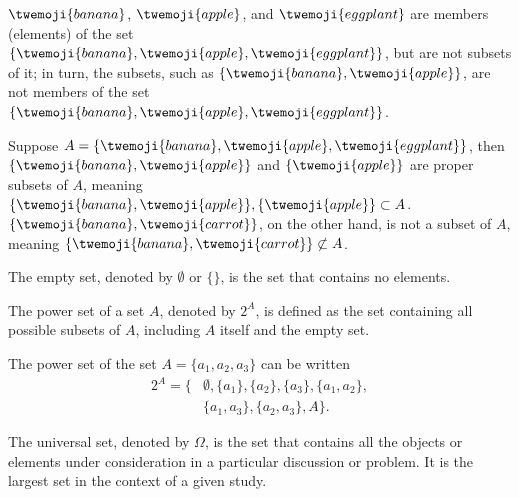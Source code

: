 \newpage
\begin{example}
	$\twemoji{banana}$, $\twemoji{apple}$, and $\twemoji{eggplant}$ are members (elements) of the set $\{\twemoji{banana}, \twemoji{apple}, \twemoji{eggplant}\}$, but are not subsets of it; in turn, the subsets, such as $\{\twemoji{banana},\twemoji{apple}\}$, are not members of the set $\{\twemoji{banana}, \twemoji{apple}, \twemoji{eggplant}\}$.
\end{example}

\begin{example}
	Suppose $A = \{\twemoji{banana}, \twemoji{apple}, \twemoji{eggplant}\}$, then $\{\twemoji{banana}, \twemoji{apple}\}$ and $\{\twemoji{apple}\}$ are proper subsets of $A$, meaning $\{\twemoji{banana}, \twemoji{apple}\},\{\twemoji{apple}\}\subset  A$. $\{\twemoji{banana}, \twemoji{carrot}\}$, on the other hand, is not a subset of $A$, meaning $\{\twemoji{banana}, \twemoji{carrot}\}\not\subset  A$.
\end{example}

\begin{definition}
	The empty set, denoted by $\emptyset$ or $\{\}$, is the set that contains no elements.
\end{definition}

\begin{definition}
	\label{def:power_set}
	The power set of a set $A$, denoted by $2^A$, is defined as the set containing all possible subsets of $A$, including $A$ itself and the empty set.
\end{definition}

\begin{example}
	The power set of the set $A = \{a_1,a_2,a_3\}$ can be written
	\begin{equation}
		\begin{split}
			2^A = \{&\emptyset, \{a_1\}, \{a_2\}, \{a_3\}, \{a_1, a_2\},\\
			& \{a_1, a_3\}, \{a_2, a_3\}, A\}.
		\end{split}
	\end{equation}
\end{example}

\begin{definition}
	\label{def:universal_set}
	The universal set, denoted by $\Omega$, is the set that contains all the objects or elements under consideration in a particular discussion or problem. It is the largest set in the context of a given study.
\end{definition}

